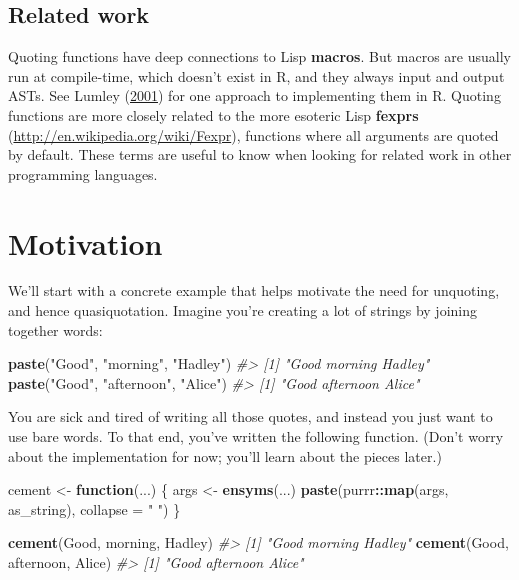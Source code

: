 \documentclass[]{book}
\newenvironment{Shaded}{\begin{snugshade}}{\end{snugshade}}
\newcommand{\CommentTok}[1]{\textcolor[rgb]{0.37,0.37,0.37}{\textit{#1}}}
\newcommand{\ControlFlowTok}[1]{\textcolor[rgb]{0.27,0.27,0.27}{\textbf{#1}}}
\newcommand{\DataTypeTok}[1]{\textcolor[rgb]{0.27,0.27,0.27}{#1}}
\newcommand{\KeywordTok}[1]{\textcolor[rgb]{0.27,0.27,0.27}{\textbf{#1}}}
\newcommand{\NormalTok}[1]{#1}
\newcommand{\OperatorTok}[1]{\textcolor[rgb]{0.43,0.43,0.43}{\textbf{#1}}}
\newcommand{\StringTok}[1]{\textcolor[rgb]{0.5,0.5,0.5}{#1}}
\renewcommand{\href}[2]{#2 (\url{#1})}
\begin{document}
\hypertarget{related-work}{%
\subsection*{Related work}\label{related-work}}


Quoting functions have deep connections to Lisp \textbf{macros}. But macros are usually run at compile-time, which doesn't exist in R, and they always input and output ASTs. See Lumley (\protect\hyperlink{ref-lumley-2001}{2001}) for one approach to implementing them in R. Quoting functions are more closely related to the more esoteric Lisp \href{http://en.wikipedia.org/wiki/Fexpr}{\textbf{fexprs}}, functions where all arguments are quoted by default. These terms are useful to know when looking for related work in other programming languages.

\hypertarget{quasi-motivation}{%
\section{Motivation}\label{quasi-motivation}}

We'll start with a concrete example that helps motivate the need for unquoting, and hence quasiquotation. Imagine you're creating a lot of strings by joining together words:

\begin{Shaded}
\begin{Highlighting}[]
\KeywordTok{paste}\NormalTok{(}\StringTok{"Good"}\NormalTok{, }\StringTok{"morning"}\NormalTok{, }\StringTok{"Hadley"}\NormalTok{)}
\CommentTok{#> [1] "Good morning Hadley"}
\KeywordTok{paste}\NormalTok{(}\StringTok{"Good"}\NormalTok{, }\StringTok{"afternoon"}\NormalTok{, }\StringTok{"Alice"}\NormalTok{)}
\CommentTok{#> [1] "Good afternoon Alice"}
\end{Highlighting}
\end{Shaded}

You are sick and tired of writing all those quotes, and instead you just want to use bare words. To that end, you've written the following function. (Don't worry about the implementation for now; you'll learn about the pieces later.)

\begin{Shaded}
\begin{Highlighting}[]
\NormalTok{cement <-}\StringTok{ }\ControlFlowTok{function}\NormalTok{(...) \{}
\NormalTok{  args <-}\StringTok{ }\KeywordTok{ensyms}\NormalTok{(...)}
  \KeywordTok{paste}\NormalTok{(purrr}\OperatorTok{::}\KeywordTok{map}\NormalTok{(args, as_string), }\DataTypeTok{collapse =} \StringTok{" "}\NormalTok{)}
\NormalTok{\}}

\KeywordTok{cement}\NormalTok{(Good, morning, Hadley)}
\CommentTok{#> [1] "Good morning Hadley"}
\KeywordTok{cement}\NormalTok{(Good, afternoon, Alice)}
\CommentTok{#> [1] "Good afternoon Alice"}
\end{Highlighting}
\end{Shaded}
\end{document}
